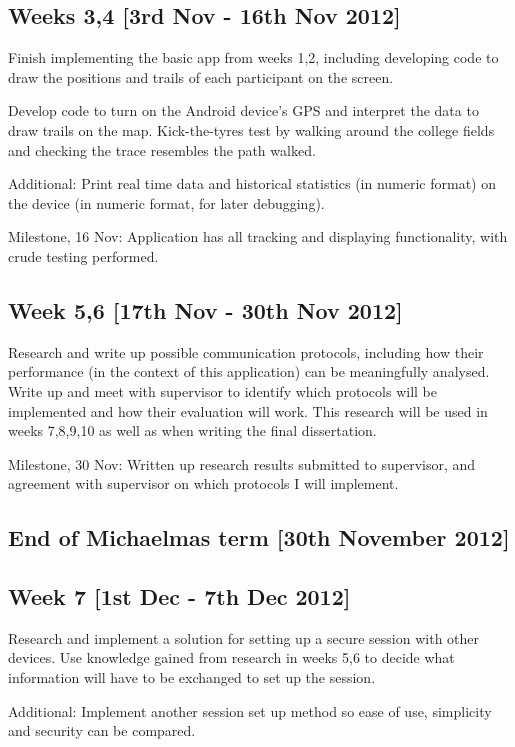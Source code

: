 \documentclass[12pt,twoside,notitlepage]{report}
\begin{document}
\subsection*{Weeks 3,4 [3rd Nov - 16th Nov 2012]}
Finish implementing the basic app from weeks 1,2, including developing code to draw the positions and trails of each participant on the screen.

Develop code to turn on the Android device's GPS and interpret the data to draw trails on the map.  Kick-the-tyres test by walking around the college fields and checking the trace resembles the path walked.

Additional: Print real time data and historical statistics (in numeric format) on the device (in numeric format, for later debugging).

Milestone, 16 Nov: Application has all tracking and displaying functionality, with crude testing performed.

\subsection*{Week 5,6 [17th Nov - 30th Nov 2012]}
Research and write up possible communication protocols, including how their performance (in the context of this application) can be meaningfully analysed.  Write up and meet with supervisor to identify which protocols will be implemented and how their evaluation will work.
This research will be used in weeks 7,8,9,10 as well as when writing the final dissertation.

Milestone, 30 Nov: Written up research results submitted to supervisor, and agreement with supervisor on which protocols I will implement.

\subsection*{End of Michaelmas term [30th November 2012]}

\subsection*{Week 7 [1st Dec - 7th Dec 2012]}
Research and implement a solution for setting up a secure session with other devices.
Use knowledge gained from research in weeks 5,6 to decide what information will have to be exchanged to set up the session.

Additional: Implement another session set up method so ease of use, simplicity and security can be compared.
\end{document}
